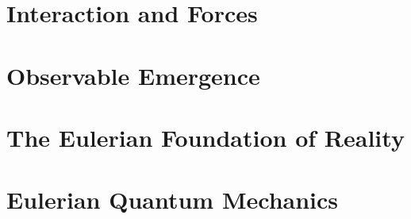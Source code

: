 \documentclass[12pt, oneside]{book}
\theoremstyle{definition}
\begin{document}
\part{Interaction and Forces}










\part{Observable Emergence}








\part{The Eulerian Foundation of Reality}






\part{Eulerian Quantum Mechanics}








\end{document}
